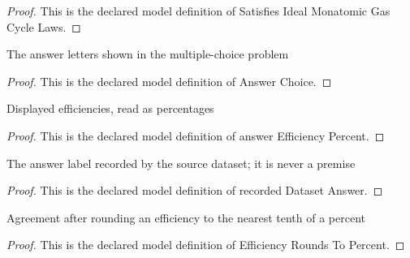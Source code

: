 \begin{proof}
  This is the declared model definition of Satisfies Ideal Monatomic Gas Cycle Laws.
\end{proof}
\begin{definition}
  \label{def:physics:phyx-mini-0351:phyxminiproblems-problemphyxmini0351-answerchoice}
  The answer letters shown in the multiple-choice problem
\end{definition}
\begin{proof}
  This is the declared model definition of Answer Choice.
\end{proof}
\begin{definition}
  \label{def:physics:phyx-mini-0351:phyxminiproblems-problemphyxmini0351-answerefficiencypercent}
  Displayed efficiencies, read as percentages
\end{definition}
\begin{proof}
  This is the declared model definition of answer Efficiency Percent.
\end{proof}
\begin{definition}
  \label{def:physics:phyx-mini-0351:phyxminiproblems-problemphyxmini0351-recordeddatasetanswer}
  The answer label recorded by the source dataset; it is never a premise
\end{definition}
\begin{proof}
  This is the declared model definition of recorded Dataset Answer.
\end{proof}
\begin{definition}
  \label{def:physics:phyx-mini-0351:phyxminiproblems-problemphyxmini0351-efficiencyroundstopercent}
  Agreement after rounding an efficiency to the nearest tenth of a percent
\end{definition}
\begin{proof}
  This is the declared model definition of Efficiency Rounds To Percent.
\end{proof}
